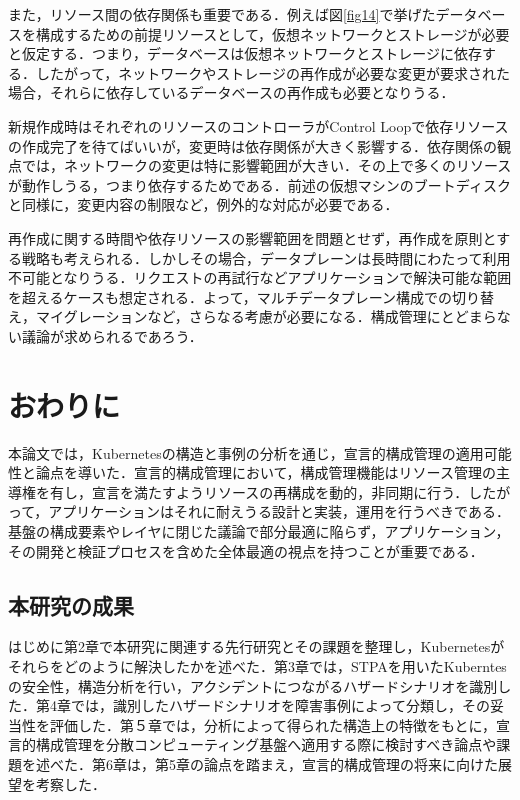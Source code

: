 \documentclass[12pt,a4j]{ujreport}
\begin{document}
また，リソース間の依存関係も重要である．例えば図\ref{fig14}で挙げたデータベースを構成するための前提リソースとして，仮想ネットワークとストレージが必要と仮定する．つまり，データベースは仮想ネットワークとストレージに依存する．したがって，ネットワークやストレージの再作成が必要な変更が要求された場合，それらに依存しているデータベースの再作成も必要となりうる．

新規作成時はそれぞれのリソースのコントローラがControl Loopで依存リソースの作成完了を待てばいいが，変更時は依存関係が大きく影響する．依存関係の観点では，ネットワークの変更は特に影響範囲が大きい．その上で多くのリソースが動作しうる，つまり依存するためである．前述の仮想マシンのブートディスクと同様に，変更内容の制限など，例外的な対応が必要である．

再作成に関する時間や依存リソースの影響範囲を問題とせず，再作成を原則とする戦略も考えられる．しかしその場合，データプレーンは長時間にわたって利用不可能となりうる．リクエストの再試行などアプリケーションで解決可能な範囲を超えるケースも想定される．よって，マルチデータプレーン構成での切り替え，マイグレーションなど，さらなる考慮が必要になる．構成管理にとどまらない議論が求められるであろう．

\chapter{おわりに}

本論文では，Kubernetesの構造と事例の分析を通じ，宣言的構成管理の適用可能性と論点を導いた．宣言的構成管理において，構成管理機能はリソース管理の主導権を有し，宣言を満たすようリソースの再構成を動的，非同期に行う．したがって，アプリケーションはそれに耐えうる設計と実装，運用を行うべきである．基盤の構成要素やレイヤに閉じた議論で部分最適に陥らず，アプリケーション，その開発と検証プロセスを含めた全体最適の視点を持つことが重要である．

\section{本研究の成果}
はじめに第2章で本研究に関連する先行研究とその課題を整理し，Kubernetesがそれらをどのように解決したかを述べた．第3章では，STPAを用いたKuberntesの安全性，構造分析を行い，アクシデントにつながるハザードシナリオを識別した．第4章では，識別したハザードシナリオを障害事例によって分類し，その妥当性を評価した．第５章では，分析によって得られた構造上の特徴をもとに，宣言的構成管理を分散コンピューティング基盤へ適用する際に検討すべき論点や課題を述べた．第6章は，第5章の論点を踏まえ，宣言的構成管理の将来に向けた展望を考察した．
\end{document}
